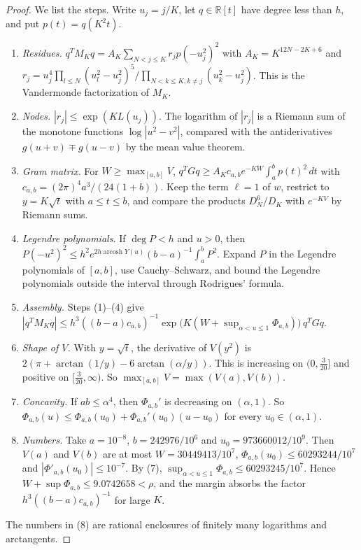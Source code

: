 \documentclass[11pt]{amsart}
\theoremstyle{definition}
\theoremstyle{remark}
\numberwithin{equation}{section}
\newcommand{\R}{\mathbb R}
\newcommand{\arcosh}{\operatorname{arcosh}}
\begin{document}
\begin{proof}
We list the steps. Write $u_j=j/K$, let $q\in\R[t]$ have degree less than $h$, and put $p(t)=q(K^2t)$.
\begin{enumerate}[label=(\arabic*),leftmargin=*]
\item \emph{Residues.} $q^TM_Kq=A_K\sum_{N<j\le K}r_jp(-u_j^2)^2$ with $A_K=K^{12N-2K+6}$ and
 $r_j=u_j^4\prod_{l\le N}(u_l^2-u_j^2)^5/\prod_{N<k\le K,k\ne j}(u_k^2-u_j^2)$. This is the Vandermonde factorization of
 $M_K$.
\item \emph{Nodes.} $|r_j|\le\exp(KL(u_j))$. The logarithm of $|r_j|$ is a Riemann sum of the monotone functions
 $\log|u^2-v^2|$, compared with the antiderivatives $g(u+v)\mp g(u-v)$ by the mean value theorem.
\item \emph{Gram matrix.} For $W\ge\max_{[a,b]}V$,
 $q^TGq\ge A_Kc_{a,b}e^{-KW}\int_a^bp(t)^2\,dt$ with $c_{a,b}=(2\pi)^4a^3/(24(1+b))$. Keep the term $\ell=1$ of $w$,
 restrict to $y=K\sqrt t$ with $a\le t\le b$, and compare the products $D_N^6/D_K$ with $e^{-KV}$ by Riemann sums.
\item \emph{Legendre polynomials.} If $\deg P<h$ and $u>0$, then
 $P(-u^2)^2\le h^2e^{2h\arcosh Y(u)}(b-a)^{-1}\int_a^bP^2$. Expand $P$ in the Legendre polynomials of $[a,b]$, use
 Cauchy--Schwarz, and bound the Legendre polynomials outside the interval through Rodrigues' formula.
\item \emph{Assembly.} Steps (1)--(4) give
 $|q^TM_Kq|\le h^3((b-a)c_{a,b})^{-1}\exp\bigl(K(W+\sup_{\alpha<u\le1}\Phi_{a,b})\bigr)\,q^TGq$.
\item \emph{Shape of $V$.} With $y=\sqrt t$, the derivative of $V(y^2)$ is $2(\pi+\arctan(1/y)-6\arctan(\alpha/y))$.
 This is increasing on $(0,\frac3{20}]$ and positive on $[\frac3{20},\infty)$. So $\max_{[a,b]}V=\max(V(a),V(b))$.
\item \emph{Concavity.} If $ab\le\alpha^4$, then $\Phi_{a,b}'$ is decreasing on $(\alpha,1)$. So
 $\Phi_{a,b}(u)\le\Phi_{a,b}(u_0)+\Phi_{a,b}'(u_0)(u-u_0)$ for every $u_0\in(\alpha,1)$.
\item \emph{Numbers.} Take $a=10^{-8}$, $b=242976/10^6$ and $u_0=973660012/10^9$. Then $V(a)$ and $V(b)$ are at most $W=30449413/10^7$, $\Phi_{a,b}(u_0)\le60293244/10^7$ and
 $|\Phi'_{a,b}(u_0)|\le10^{-7}$. By (7), $\sup_{\alpha<u\le1}\Phi_{a,b}\le60293245/10^7$. Hence
 $W+\sup\Phi_{a,b}\le9.0742658<\rho$, and the margin absorbs the factor $h^3((b-a)c_{a,b})^{-1}$ for large $K$.
\end{enumerate}
The numbers in (8) are rational enclosures of finitely many logarithms and arctangents.
\end{proof}
\end{document}
